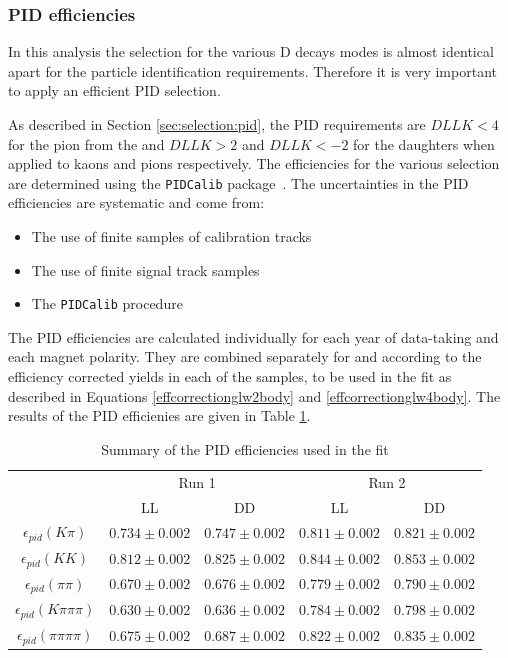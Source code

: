 \subsubsection{PID efficiencies}
\label{sec:cpfit:efficiencies:pid}

In this analysis the selection for the various D decays modes \decay{\D}{\kaon\pi, \kaon\kaon, \pi\pi, \pi\kaon} is almost identical apart for the particle identification requirements. Therefore it is very important to apply an efficient PID selection.

As described in Section \ref{sec:selection:pid}, the PID requirements are $DLLK < 4$ for the pion from the \Kstarm and $DLLK > 2$ and $DLLK < -2$ for the \D daughters when applied to kaons and pions respectively. The efficiencies for the various selection are determined using the {\tt PIDCalib} package~\cite{PIDCalib}. The uncertainties in the PID efficiencies are systematic and come from:


\begin{itemize}
\item The use of finite samples of \Dstar calibration tracks
\item The use of finite signal track samples
\item The {\tt PIDCalib} procedure
\end{itemize}

The PID efficiencies are calculated individually for each year of data-taking and each magnet polarity. They are combined separately for \runone and \runtwo according to the efficiency corrected yields in each of the samples, to be used in the \CP fit as described in Equations \ref{effcorrectionglw2body} and \ref{effcorrectionglw4body}. The results of the PID efficienies are given in Table \ref{pideff}.

\begin{table}[h]
\centering
\begin{tabular}{c|cc|cc}
\hline
& \multicolumn{2}{c}{Run 1} & \multicolumn{2}{c}{Run 2} \\
& LL & DD & LL & DD \\
\hline
$\epsilon_{pid}(K\pi)$ & $0.734 \pm 0.002$ & $0.747 \pm 0.002$ & $0.811 \pm 0.002$ & $0.821 \pm 0.002$ \\
$\epsilon_{pid}(KK)$ & $0.812 \pm 0.002$ & $0.825 \pm 0.002$ & $0.844 \pm 0.002$ & $0.853 \pm 0.002$ \\
$\epsilon_{pid}(\pi\pi)$ & $0.670 \pm 0.002$ & $0.676 \pm 0.002$ & $0.779 \pm 0.002$ & $0.790 \pm 0.002$ \\
$\epsilon_{pid}(K\pi\pi\pi)$ & $0.630 \pm 0.002$ & $0.636 \pm 0.002$ & $0.784 \pm 0.002$ & $0.798 \pm 0.002$ \\
$\epsilon_{pid}(\pi\pi\pi\pi)$ & $0.675 \pm 0.002$ & $0.687 \pm 0.002$ & $0.822 \pm 0.002$ & $0.835 \pm 0.002$ \\
\hline
\end{tabular}
\caption{Summary of the PID efficiencies used in the \CP fit}
\label{pideff}
\end{table}

